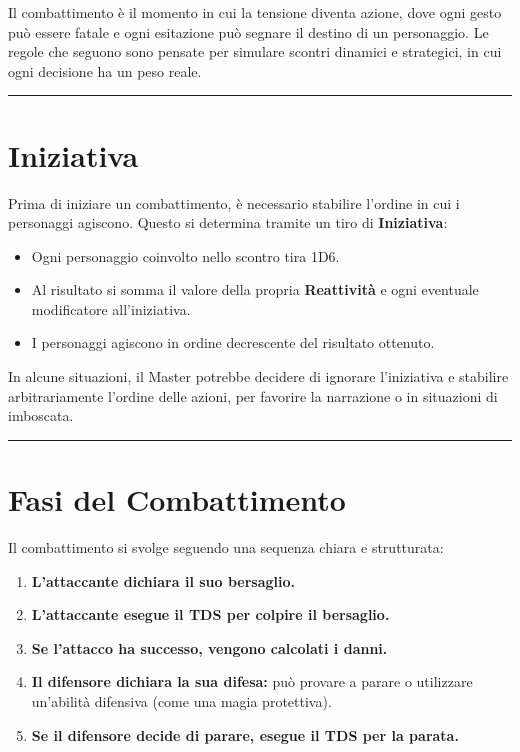 \documentclass[../manuale_main.tex]{subfiles}
\begin{document}
Il combattimento è il momento in cui la tensione diventa azione, dove ogni gesto può essere fatale e ogni esitazione può segnare il destino di un personaggio. Le regole che seguono sono pensate per simulare scontri dinamici e strategici, in cui ogni decisione ha un peso reale.


\vspace{0.5cm}
\noindent
\begin{center}
\rule{\textwidth}{0.4pt} 
\end{center}
\vspace{0.5cm}

\section{Iniziativa}
Prima di iniziare un combattimento, è necessario stabilire l'ordine in cui i personaggi agiscono. Questo si determina tramite un tiro di \textbf{Iniziativa}:

\begin{itemize}
    \item Ogni personaggio coinvolto nello scontro tira 1D6.
    \item Al risultato si somma il valore della propria \textbf{Reattività} e ogni eventuale modificatore all'iniziativa.
    \item I personaggi agiscono in ordine decrescente del risultato ottenuto.
\end{itemize}

In alcune situazioni, il Master potrebbe decidere di ignorare l’iniziativa e stabilire arbitrariamente l’ordine delle azioni, per favorire la narrazione o in situazioni di imboscata.


\vspace{0.5cm}
\noindent
\begin{center}
\rule{\textwidth}{0.4pt} 
\end{center}
\vspace{0.5cm}

\section{Fasi del Combattimento}
Il combattimento si svolge seguendo una sequenza chiara e strutturata:

\begin{enumerate}
    \item \textbf{L'attaccante dichiara il suo bersaglio.}
    \item \textbf{L'attaccante esegue il TDS per colpire il bersaglio.}
    \item \textbf{Se l'attacco ha successo, vengono calcolati i danni.}
    \item \textbf{Il difensore dichiara la sua difesa:} può provare a parare o utilizzare un'abilità difensiva (come una magia protettiva).
    \item \textbf{Se il difensore decide di parare, esegue il TDS per la parata.}
\end{enumerate}
\end{document}
